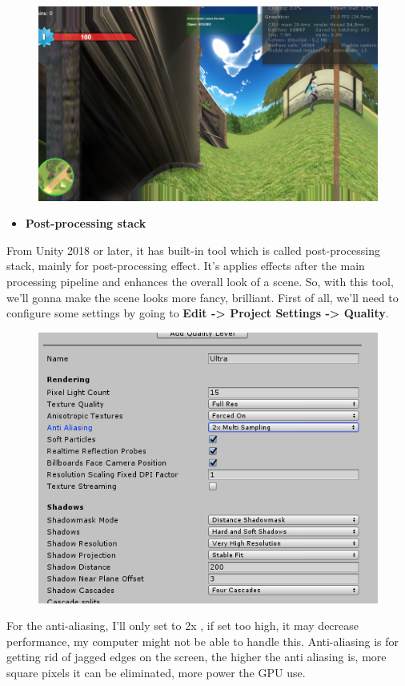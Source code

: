 \documentclass[a4paper, 13pt]{extarticle}
\begin{document}
{\begin{figure}[h]
 	\begin{minipage}{1\textwidth}
 		\centering
 		\includegraphics[width=0.7\linewidth]{intructions/dizzy.png}
 		\centering
 		\label{fig:test33}
 	\end{minipage}      	
 \end{figure}
\begin{itemize}
	\item \bfseries Post-processing stack 
\end{itemize} 
From Unity 2018 or later, it has built-in tool which is called post-processing stack, mainly for post-processing effect.  It’s applies effects after the main processing pipeline and enhances the overall look of a scene. So, with this tool, we'll gonna make the scene looks more fancy, brilliant. 
First of all, we'll need to configure some settings by going to {\bfseries Edit -> Project Settings -> Quality}. 
  \begin{figure}[h] 
 	\begin{minipage}{1\textwidth}
 		\centering
 		\includegraphics[width=0.5\linewidth]{intructions/quality_setting.png}
 		\centering
 		\label{fig:test34}
 	\end{minipage}      	
 \end{figure}
For the anti-aliasing, I'll only set to 2x , if set too high, it may decrease performance, my computer might not be able to handle this. Anti-aliasing is for getting rid of jagged edges on the screen, the higher the anti aliasing is, more square pixels it can be eliminated, more power the GPU use. \\

}
\end{document}
